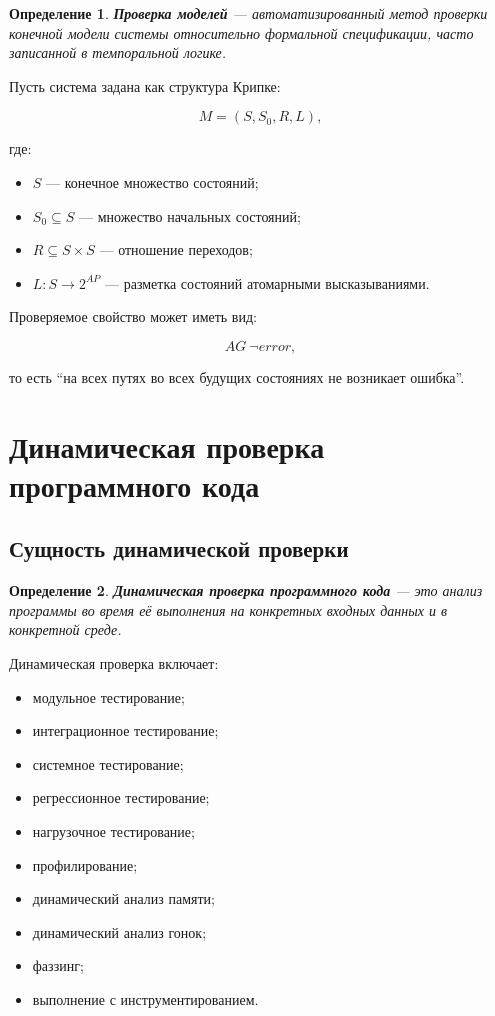 \documentclass[12pt,a4paper]{article}
\newtheorem{definition}{Определение}
\begin{document}
\begin{definition}
\textbf{Проверка моделей} --- автоматизированный метод проверки конечной модели системы относительно формальной спецификации, часто записанной в темпоральной логике.
\end{definition}

Пусть система задана как структура Крипке:

\[
M = (S,S_0,R,L),
\]

где:

\begin{itemize}
  \item $S$ --- конечное множество состояний;
  \item $S_0 \subseteq S$ --- множество начальных состояний;
  \item $R \subseteq S \times S$ --- отношение переходов;
  \item $L : S \to 2^{AP}$ --- разметка состояний атомарными высказываниями.
\end{itemize}

Проверяемое свойство может иметь вид:

\[
AG\ \neg error,
\]

то есть ``на всех путях во всех будущих состояниях не возникает ошибка''.

\section{Динамическая проверка программного кода}

\subsection{Сущность динамической проверки}

\begin{definition}
\textbf{Динамическая проверка программного кода} --- это анализ программы во время её выполнения на конкретных входных данных и в конкретной среде.
\end{definition}

Динамическая проверка включает:

\begin{itemize}
  \item модульное тестирование;
  \item интеграционное тестирование;
  \item системное тестирование;
  \item регрессионное тестирование;
  \item нагрузочное тестирование;
  \item профилирование;
  \item динамический анализ памяти;
  \item динамический анализ гонок;
  \item фаззинг;
  \item выполнение с инструментированием.
\end{itemize}
\end{document}
